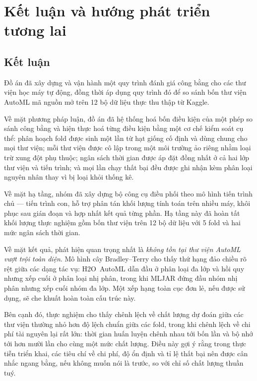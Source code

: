 \chapter{Kết luận và hướng phát triển tương lai}
\label{ch:ketluan}

\section{Kết luận}
\label{sec:ketluan}
Đồ án đã xây dựng và vận hành một quy trình đánh giá công bằng cho các thư viện
học máy tự động, đồng thời áp dụng quy trình đó để so sánh bốn thư viện AutoML mã
nguồn mở trên 12 bộ dữ liệu thực thu thập từ Kaggle.

Về mặt phương pháp luận, đồ án đã hệ thống hoá bốn điều kiện của một phép so sánh
công bằng và hiện thực hoá từng điều kiện bằng một cơ chế kiểm soát cụ thể: phân
hoạch fold được sinh một lần từ hạt giống cố định và dùng chung cho mọi thư viện;
mỗi thư viện được cô lập trong một môi trường ảo riêng nhằm loại trừ xung đột phụ
thuộc; ngân sách thời gian được áp đặt đồng nhất ở cả hai lớp thư viện và tiến
trình; và mọi lần chạy thất bại đều được ghi nhận kèm phân loại nguyên nhân thay
vì bị loại khỏi thống kê.

Về mặt hạ tầng, nhóm đã xây dựng bộ công cụ điều phối theo mô hình tiến trình chủ
--- tiến trình con, hỗ trợ phân tán khối lượng tính toán trên nhiều máy, khôi phục
sau gián đoạn và hợp nhất kết quả từng phần. Hạ tầng này đã hoàn tất khối lượng
thực nghiệm gồm bốn thư viện trên 12 bộ dữ liệu với 5 fold và hai mức ngân sách
thời gian.

Về mặt kết quả, phát hiện quan trọng nhất là \emph{không tồn tại thư viện AutoML
vượt trội toàn diện}. Mô hình cây Bradley--Terry cho thấy thứ hạng đảo chiều rõ
rệt giữa các dạng tác vụ: H2O~AutoML dẫn đầu ở phân loại đa lớp và hồi quy nhưng
xếp cuối ở phân loại nhị phân, trong khi MLJAR đứng đầu nhóm nhị phân nhưng xếp
cuối nhóm đa lớp. Một xếp hạng toàn cục đơn lẻ, nếu được sử dụng, sẽ che khuất
hoàn toàn cấu trúc này.

Bên cạnh đó, thực nghiệm cho thấy chênh lệch về chất lượng dự đoán giữa các thư
viện thường nhỏ hơn độ lệch chuẩn giữa các fold, trong khi chênh lệch về chi phí
tài nguyên lại rất lớn: thời gian huấn luyện chênh nhau tới bốn lần và bộ nhớ tới
hơn mười lần cho cùng một mức chất lượng. Điều này gợi ý rằng trong thực tiễn
triển khai, các tiêu chí về chi phí, độ ổn định và tỉ lệ thất bại nên được cân
nhắc ngang bằng, nếu không muốn nói là trước, so với chỉ số chất lượng thuần tuý.

